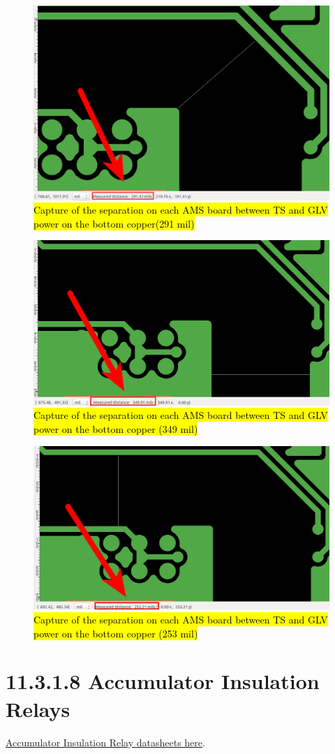 \documentclass{article}
\DeclareRobustCommand{\hlr}[1]{{\sethlcolor{red}\hl{#1}}}
\begin{document}
{\begin{figure}[H]
 \centering
 \includegraphics[width = 0.45 \textwidth]{bmsspace3}
 \caption{\hlr{Capture of the separation on each AMS board between TS and GLV power on the bottom copper(291 mil)}}
 \label{amsseparation3}
\end{figure}

\begin{figure}[H]
 \centering
 \includegraphics[width = 0.45 \textwidth]{bmsspace4}
 \caption{\hlr{Capture of the separation on each AMS board between TS and GLV power on the bottom copper (349 mil)}}
 \label{amsseparation4}
\end{figure}

\begin{figure}[H]
 \centering
 \includegraphics[width = 0.45 \textwidth]{bmsspace5}
 \caption{\hlr{Capture of the separation on each AMS board between TS and GLV power on the bottom copper (253 mil)}}
 \label{amsseparation5}
\end{figure}

\section*{11.3.1.8 Accumulator Insulation Relays}

\href{http://www.rec-bms.com/datasheet/Technical_datasheet_Kilovac.pdf}{Accumulator Insulation Relay datasheets here}.

}
\end{document}
